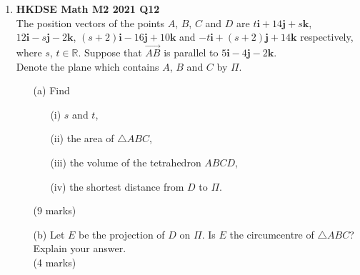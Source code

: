 \documentclass{report}
\begin{document}
\begin{enumerate}
	\item \textbf{HKDSE Math M2 2021 Q12}\\
	The position vectors of the points $A$, $B$, $C$ and $D$ are  $t\textbf{i} +14 \textbf{j}+s \textbf {k}$, $12\textbf{i} -s \textbf{j}-2 \textbf {k}$, $(s+2)\textbf{i} -16 \textbf{j}+10 \textbf {k}$ and $-t\textbf{i} +(s+2) \textbf{j}+14 \textbf {k}$  respectively, where $s$, $t \in \mathbb{R}$. Suppose that $\overrightarrow{AB}$ is parallel to $5\textbf{i} -4 \textbf{j}-2 \textbf {k}$. \\Denote the plane which contains $A$, $B$ and $C$ by $\Pi$.
	\begin{enumerate}
		\item [(a)]Find
		\begin{enumerate}
			\item [(i)]$s$ and $t$,
			\item [(ii)]the area of $\triangle ABC$,
			\item [(iii)]the volume of the tetrahedron $ABCD$,
			\item [(iv)]the shortest distance from $D$ to $\Pi$.
		\end{enumerate}
		(9 marks)
		\item [(b)]Let $E$ be the projection of  $D$ on $\Pi$. Is $E$ the circumcentre of $\triangle ABC$? Explain your answer.\\(4 marks)
	\end{enumerate}

\end{enumerate}
\end{document}
